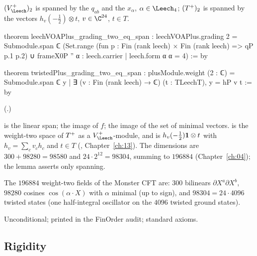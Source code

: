 \begin{lemma}\label{ch20:lem:span}
$(\chtwentyVL)_2$ is spanned by the $q_{ab}$ and the $x_\alpha$, $\alpha\in\chtwentyLf$; $(T^{+})_2$ is spanned by the vectors
$h_v(-\tfrac12)\otimes t$, $v\in\C^{24}$, $t\in T$.
\end{lemma}
\begin{leancode}
theorem leechVOAPlus_grading_two_eq_span :
    leechVOAPlus.grading 2 = Submodule.span ℂ
      (Set.range (fun p : Fin (rank leech) × Fin (rank leech) => qP p.1 p.2) ∪
        frameX0P '' {α : leech.carrier | leech.form α α = 4}) := by

theorem twistedPlus_grading_two_eq_span :
    plusModule.weight (2 : ℂ) = Submodule.span ℂ
      {y | ∃ (v : Fin (rank leech) → ℂ) (t : TLeechT), y = hP v t} := by
\end{leancode}
(.)
\begin{dictionary}
 is the linear span;  the image of $f$;  the image of
the set of minimal vectors.   is the weight-two space of $T^{+}$ as a
$\chtwentyVL$-module, and  is $h_v(-\tfrac12)\mathbf 1\otimes t$ with $h_v=\sum_cv_ch_c$ and $t\in T$
(, Chapter~\ref{ch:13}).  The dimensions are $300+98280=98580$ and $24\cdot2^{12}=98304$, summing to $196884$
(Chapter~\ref{ch:04}); the lemma asserts only spanning.
\end{dictionary}
\begin{physics}
The $196884$ weight-two fields of the Monster CFT are: $300$ bilinears $\partial X^a\partial X^b$, $98280$ cosines
$\cos(\alpha\cdot X)$ with $\alpha$ minimal (up to sign), and $98304=24\cdot4096$ twisted states (one half-integral oscillator on
the $4096$ twisted ground states).
\end{physics}
\begin{status}
Unconditional; printed in the FinOrder audit; standard axioms.
\end{status}

\subsection{Rigidity}\label{ch20:sec:rigid}

